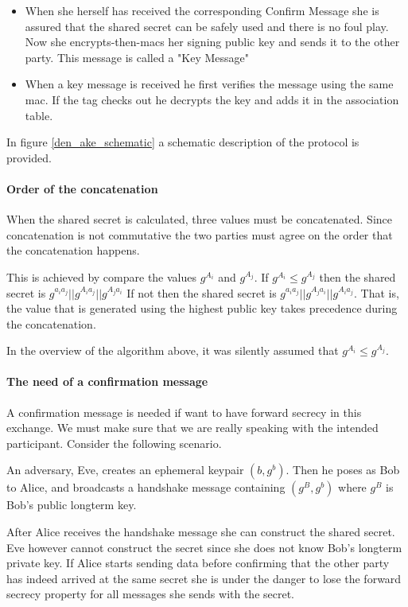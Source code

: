 \documentclass[12pt,titlepage,a4paper]{article}
\begin{document}
{\begin{itemize}
	\item[] When she herself has received the corresponding Confirm Message she is assured that
		the shared secret can be safely used and there is no foul play. Now she
		encrypts-then-macs her signing public key and sends it to the other party. This
		message is called a "Key Message"


	\item[] When a key message is received he first verifies the message using the same mac.
		If the tag checks out he decrypts the key and adds it in the association table.
\end{itemize}

In figure \ref{den_ake_schematic} a schematic description of the protocol is provided.

\paragraph{Order of the concatenation}
When the shared secret is calculated, three values must be concatenated. Since
concatenation is not commutative the two parties must agree on the order that the
concatenation happens.

This is achieved by compare the values $g^{A_i}$ and $g^{A_j}$. If
$g^{A_i} \le g^{A_j}$ then the shared secret is $g^{a_ia_j} || g^{A_ia_j} || g^{A_ja_i}$
If not then the shared secret is $g^{a_ia_j} || g^{A_ja_i} || g^{A_ia_j}$. That is, the
value that is generated using the highest public key takes precedence during the
concatenation.

In the overview of the algorithm above, it was silently assumed that
$g^{A_i} \le g^{A_j}$.

\paragraph{The need of a confirmation message}
\label{confirm_message_explain}
A confirmation message is needed if want to have forward secrecy in this exchange.
We must make sure that we are really speaking with the intended participant. Consider
the following scenario.

An adversary, Eve, creates an ephemeral keypair $(b, g^b)$. Then he poses as Bob to Alice,
and broadcasts a handshake message containing $(g^B,g^b)$ where $g^B$ is Bob's
public longterm key.

After Alice receives the handshake message she can construct the shared secret. Eve
however cannot construct the secret since she does not know Bob's longterm
private key. If Alice starts sending data before confirming that the other party
has indeed arrived at the same secret she is under the danger to lose the forward
secrecy property for all messages she sends with the secret.

}
\end{document}
